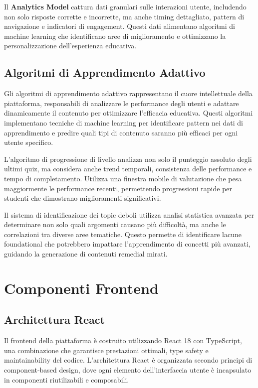 \documentclass[12pt,a4paper]{article}
\begin{document}
Il \textbf{Analytics Model} cattura dati granulari sulle interazioni utente, includendo non solo risposte corrette e incorrette, ma anche timing dettagliato, pattern di navigazione e indicatori di engagement. Questi dati alimentano algoritmi di machine learning che identificano aree di miglioramento e ottimizzano la personalizzazione dell'esperienza educativa.

\subsection{Algoritmi di Apprendimento Adattivo}

Gli algoritmi di apprendimento adattivo rappresentano il cuore intellettuale della piattaforma, responsabili di analizzare le performance degli utenti e adattare dinamicamente il contenuto per ottimizzare l'efficacia educativa. Questi algoritmi implementano tecniche di machine learning per identificare pattern nei dati di apprendimento e predire quali tipi di contenuto saranno più efficaci per ogni utente specifico.

L'algoritmo di progressione di livello analizza non solo il punteggio assoluto degli ultimi quiz, ma considera anche trend temporali, consistenza delle performance e tempo di completamento. Utilizza una finestra mobile di valutazione che pesa maggiormente le performance recenti, permettendo progressioni rapide per studenti che dimostrano miglioramenti significativi.

Il sistema di identificazione dei topic deboli utilizza analisi statistica avanzata per determinare non solo quali argomenti causano più difficoltà, ma anche le correlazioni tra diverse aree tematiche. Questo permette di identificare lacune foundational che potrebbero impattare l'apprendimento di concetti più avanzati, guidando la generazione di contenuti remedial mirati.

\section{Componenti Frontend}

\subsection{Architettura React}

Il frontend della piattaforma è costruito utilizzando React 18 con TypeScript, una combinazione che garantisce prestazioni ottimali, type safety e maintainability del codice. L'architettura React è organizzata secondo principi di component-based design, dove ogni elemento dell'interfaccia utente è incapsulato in componenti riutilizabili e composabili.
\end{document}
